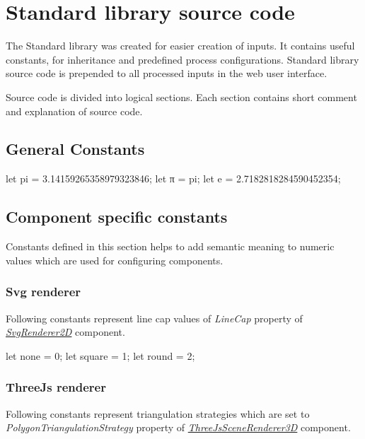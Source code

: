 
\chapter{Standard library source code}
\label{chap:stdLib}

The Standard library was created for easier creation of inputs.
It contains useful constants, \lsystems for inheritance and predefined process configurations.
Standard library source code is prepended to all processed inputs in the web user interface.

Source code is divided into logical sections.
Each section contains short comment and explanation of source code.


\section{General Constants}

\begin{LsystemBreak}
let pi = 3.14159265358979323846;
let π = pi;
let e = 2.7182818284590452354;
\end{LsystemBreak}


\section{Component specific constants}

Constants defined in this section helps to add semantic meaning to numeric values which are used for configuring components.

\subsection{Svg renderer}

Following constants represent line cap values of \emph{LineCap} property of \hyperref[Malsys.Processing.Components.Renderers.SvgRenderer2D]{\emph{SvgRenderer2D}} component.

\begin{LsystemBreak}
let none = 0;
let square = 1;
let round = 2;
\end{LsystemBreak}


\subsection{ThreeJs renderer}

Following constants represent triangulation strategies which are set to \emph{PolygonTriangulationStrategy} property of \hyperref[Malsys.Processing.Components.Renderers.ThreeJsSceneRenderer3D]{\emph{ThreeJsSceneRenderer3D}} component.

